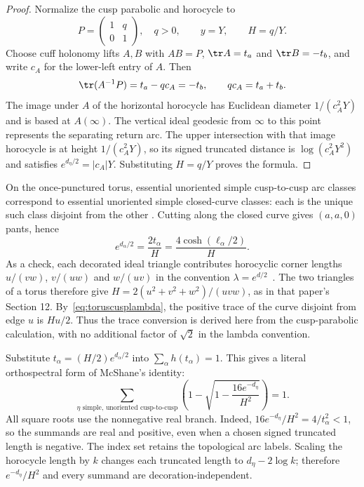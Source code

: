\begin{proof}
Normalize the cusp parabolic and horocycle to
\[
 P=\begin{pmatrix}1&q\\0&1\end{pmatrix},\quad q>0,\qquad y=Y,
 \qquad H=q/Y.
\]
Choose cuff holonomy lifts $A,B$ with $AB=P$, $\tr A=t_a$ and
$\tr B=-t_b$, and write $c_A$ for the lower-left entry of $A$. Then
\[
 \tr(A^{-1}P)=t_a-qc_A=-t_b,
 \qquad qc_A=t_a+t_b.
\]
The image under $A$ of the horizontal horocycle has Euclidean diameter
$1/(c_A^2Y)$ and is based at $A(\infty)$. The vertical ideal geodesic
from $\infty$ to this point represents the separating return arc.
The upper intersection with that image horocycle is at height
$1/(c_A^2Y)$, so its signed truncated distance is
$\log(c_A^2Y^2)$ and satisfies
$e^{d_\eta/2}=|c_A|Y$. Substituting $H=q/Y$ proves the formula.
\end{proof}

On the once-punctured torus, essential unoriented simple cusp-to-cusp arc
classes correspond to essential unoriented simple closed-curve classes:
each is the unique such class disjoint from the other
\cite[Proposition 14.1(i),(iv)]{Springborn}. Cutting along the
closed curve gives $(a,a,0)$ pants, hence
\begin{equation}
 e^{d_\alpha/2}=\frac{2t_\alpha}{H}
              =\frac{4\cosh(\ell_\alpha/2)}{H}.
 \label{eq:toruscusplambda}
\end{equation}
As a check, each decorated ideal triangle contributes horocyclic corner
lengths $u/(vw)$, $v/(uw)$ and $w/(uv)$ in the convention
$\lambda=e^{d/2}$~\cite[Section 11, equation (30)]{Springborn}.
The two triangles of a torus therefore give
$H=2(u^2+v^2+w^2)/(uvw)$, as in that paper's Section 12.
By~\eqref{eq:toruscusplambda}, the positive trace of the curve disjoint
from edge $u$ is $Hu/2$. Thus the trace conversion is derived here from
the cusp-parabolic calculation, with no additional factor of $\sqrt2$
in the lambda convention.

Substitute $t_\alpha=(H/2)e^{d_\alpha/2}$ into
$\sum_\alpha h(t_\alpha)=1$. This gives a literal orthospectral form of
McShane's identity:
\begin{equation}
 \boxed{
 \sum_{\eta\text{ simple, unoriented cusp-to-cusp}}
 \left(1-\sqrt{1-\frac{16e^{-d_\eta}}{H^2}}\right)=1.}
 \label{eq:cusporthoidentity}
\end{equation}
All square roots use the nonnegative real branch. Indeed,
$16e^{-d_\eta}/H^2=4/t_\alpha^2<1$, so the summands are real and
positive, even when a chosen signed truncated length is negative.
The index set retains the topological arc labels. Scaling the horocycle
length by $k$ changes each truncated length to $d_\eta-2\log k$;
therefore $e^{-d_\eta}/H^2$ and every summand are decoration-independent.

